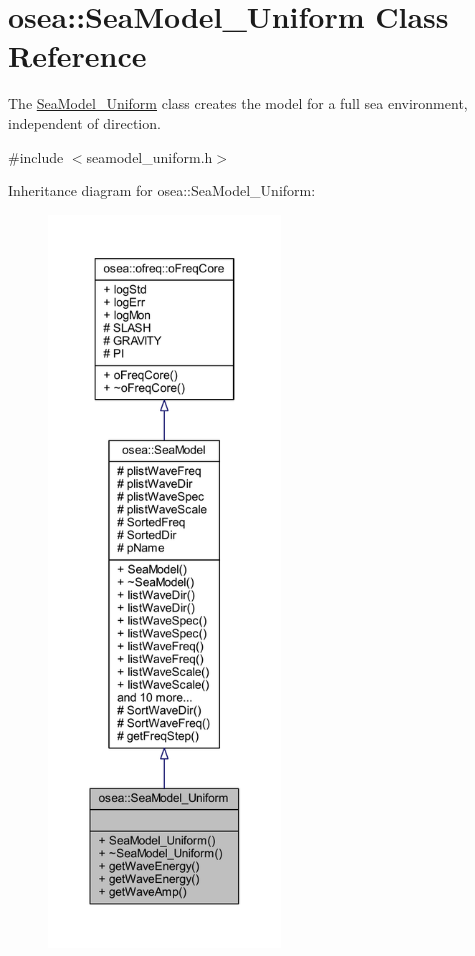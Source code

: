 \hypertarget{classosea_1_1_sea_model___uniform}{\section{osea\-:\-:Sea\-Model\-\_\-\-Uniform Class Reference}
\label{classosea_1_1_sea_model___uniform}
}


The \hyperlink{classosea_1_1_sea_model___uniform}{Sea\-Model\-\_\-\-Uniform} class creates the model for a full sea environment, independent of direction.  




{\ttfamily \#include $<$seamodel\-\_\-uniform.\-h$>$}



Inheritance diagram for osea\-:\-:Sea\-Model\-\_\-\-Uniform\-:
\nopagebreak
\begin{figure}[H]
\begin{center}
\leavevmode
\includegraphics[height=550pt]{classosea_1_1_sea_model___uniform__inherit__graph}
\end{center}
\end{figure}
